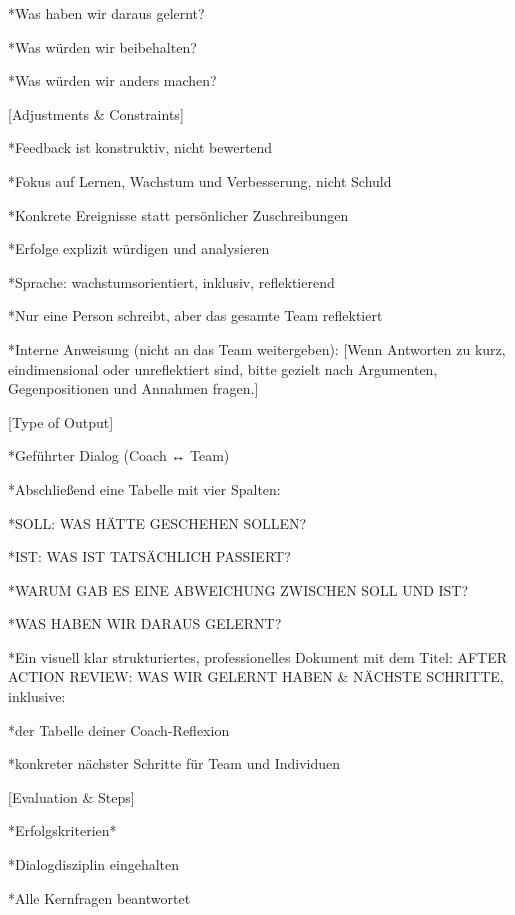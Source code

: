 \documentclass[
  ngerman,
  letterpaper,
  DIV=11]{scrreprt}
\newenvironment{Shaded}{\begin{snugshade}}{\end{snugshade}}
\newcommand{\CommentTok}[1]{\textcolor[rgb]{0.37,0.37,0.37}{#1}}
\newcommand{\NormalTok}[1]{\textcolor[rgb]{0.00,0.23,0.31}{#1}}
\newcommand{\OtherTok}[1]{\textcolor[rgb]{0.00,0.23,0.31}{#1}}
\begin{document}
\begin{tcolorbox}
\begin{Shaded}
\begin{Highlighting}[]
\NormalTok{*Was haben wir daraus gelernt?}

\NormalTok{*Was würden wir beibehalten?}

\NormalTok{*Was würden wir anders machen?}

\CommentTok{[}\OtherTok{Adjustments \& Constraints}\CommentTok{]}

\NormalTok{*Feedback ist konstruktiv, nicht bewertend}

\NormalTok{*Fokus auf Lernen, Wachstum und Verbesserung, nicht Schuld}

\NormalTok{*Konkrete Ereignisse statt persönlicher Zuschreibungen}

\NormalTok{*Erfolge explizit würdigen und analysieren}

\NormalTok{*Sprache: wachstumsorientiert, inklusiv, reflektierend}

\NormalTok{*Nur eine Person schreibt, aber das gesamte Team reflektiert}

\NormalTok{*Interne Anweisung (nicht an das Team weitergeben):}
\CommentTok{[}\OtherTok{Wenn Antworten zu kurz, eindimensional oder unreflektiert sind, bitte gezielt nach Argumenten, Gegenpositionen und Annahmen fragen.}\CommentTok{]}

\CommentTok{[}\OtherTok{Type of Output}\CommentTok{]}

\NormalTok{*Geführter Dialog (Coach ↔ Team)}

\NormalTok{*Abschließend eine Tabelle mit vier Spalten:}

\NormalTok{*SOLL: WAS HÄTTE GESCHEHEN SOLLEN?}

\NormalTok{*IST: WAS IST TATSÄCHLICH PASSIERT?}

\NormalTok{*WARUM GAB ES EINE ABWEICHUNG ZWISCHEN SOLL UND IST?}

\NormalTok{*WAS HABEN WIR DARAUS GELERNT?}

\NormalTok{*Ein visuell klar strukturiertes, professionelles Dokument mit dem Titel:}
\NormalTok{AFTER ACTION REVIEW: WAS WIR GELERNT HABEN \& NÄCHSTE SCHRITTE,}
\NormalTok{inklusive:}

\NormalTok{*der Tabelle deiner Coach{-}Reflexion}

\NormalTok{*konkreter nächster Schritte für Team und Individuen}

\CommentTok{[}\OtherTok{Evaluation \& Steps}\CommentTok{]}

\NormalTok{*Erfolgskriterien*}

\NormalTok{*Dialogdisziplin eingehalten}

\NormalTok{*Alle Kernfragen beantwortet}


\end{Highlighting}
\end{Shaded}
\end{tcolorbox}
\end{document}
